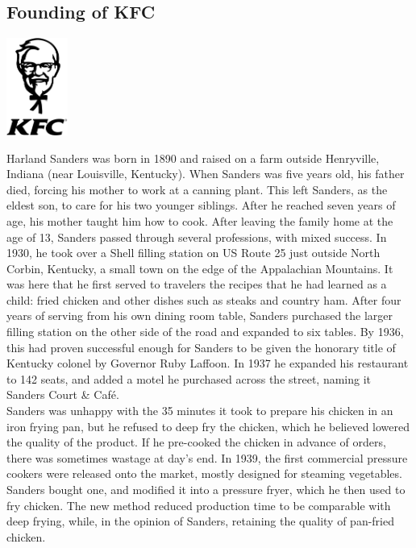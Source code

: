 \documentclass[11pt]{report}
\begin{document}
\subsection{Founding of KFC}
\vspace{2mm}\begin{center}\includegraphics[width=2cm]{./img/kfcLogo.jpg}\end{center}
Harland Sanders was born in 1890 and raised on a farm outside Henryville, Indiana (near Louisville, Kentucky). When Sanders was five years old, his father died, forcing his mother to work at a canning plant. This left Sanders, as the eldest son, to care for his two younger siblings. After he reached seven years of age, his mother taught him how to cook. After leaving the family home at the age of 13, Sanders passed through several professions, with mixed success. In 1930, he took over a Shell filling station on US Route 25 just outside North Corbin, Kentucky, a small town on the edge of the Appalachian Mountains. It was here that he first served to travelers the recipes that he had learned as a child: fried chicken and other dishes such as steaks and country ham. After four years of serving from his own dining room table, Sanders purchased the larger filling station on the other side of the road and expanded to six tables. By 1936, this had proven successful enough for Sanders to be given the honorary title of Kentucky colonel by Governor Ruby Laffoon. In 1937 he expanded his restaurant to 142 seats, and added a motel he purchased across the street, naming it Sanders Court \& Café.\\
\indent Sanders was unhappy with the 35 minutes it took to prepare his chicken in an iron frying pan, but he refused to deep fry the chicken, which he believed lowered the quality of the product. If he pre-cooked the chicken in advance of orders, there was sometimes wastage at day's end. In 1939, the first commercial pressure cookers were released onto the market, mostly designed for steaming vegetables. Sanders bought one, and modified it into a pressure fryer, which he then used to fry chicken. The new method reduced production time to be comparable with deep frying, while, in the opinion of Sanders, retaining the quality of pan-fried chicken.
\end{document}
